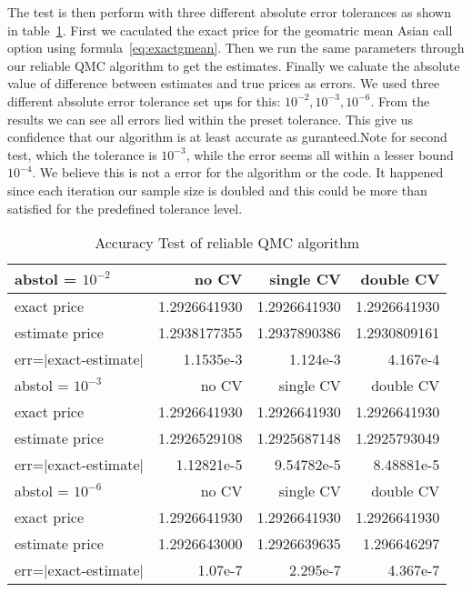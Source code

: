 The test is then perform with three different absolute error tolerances as shown in table~\ref{tb:accuracy}.
First we caculated the exact price for the geomatric mean Asian call option using formula~\eqref{eq:exactgmean}. 
Then we run the same parameters through our reliable QMC algorithm to get the estimates. 
Finally we caluate the absolute value of difference between estimates and true prices as errors. 
We used three different absolute error tolerance set ups for this: $10^{-2}, 10^{-3}, 10^{-6}$.   
From the results we can see all errors lied within the preset tolerance. This give us confidence that our algorithm is at least accurate as guranteed.Note for second test, which the tolerance is $10^{-3}$, while the error seems all within a lesser bound $10^{-4}$. We believe this is not a error for the algorithm or the code.  It happened since each iteration our sample size is doubled and this could be more than satisfied for the predefined tolerance level.
\begin{table}[h]
    \label{tb:accuracy}
    \centering
	\caption{Accuracy Test of reliable QMC algorithm}
    \begin{tabular}{lrrr}  
    \hline \hline
    abstol = $10^{-2}$ & no CV&single CV&double CV\\[0.5ex]
    \hline
    exact price& 1.2926641930& 1.2926641930&1.2926641930\\[0.5ex]
    estimate price& 1.2938177355& 1.2937890386&1.2930809161\\[0.5ex]
    err=$|$exact-estimate$|$ & 1.1535e-3& 1.124e-3&4.167e-4\\[0.5ex]
    \hline
    abstol = $10^{-3}$ & no CV&single CV&double CV\\[0.5ex]
    \hline
    exact price& 1.2926641930& 1.2926641930&1.2926641930\\[0.5ex]
    estimate price& 1.2926529108& 1.2925687148&1.2925793049\\[0.5ex]
    err=$|$exact-estimate$|$ & 1.12821e-5& 9.54782e-5&8.48881e-5\\[0.5ex]
    \hline
    abstol = $10^{-6}$ & no CV&single CV&double CV\\[0.5ex]
    \hline
    exact price& 1.2926641930& 1.2926641930&1.2926641930\\[0.5ex]
    estimate price& 1.2926643000& 1.2926639635&1.296646297\\[0.5ex]
    err=$|$exact-estimate$|$ & 1.07e-7& 2.295e-7&4.367e-7\\[0.5ex]
    \hline
    \end{tabular}
\end{table}



